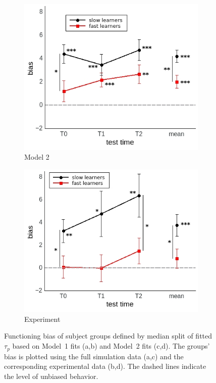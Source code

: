 \documentclass[a4paper]{scrreprt}
\begin{document}
\begin{figure}
\begin{subfigure}[b]{0.49\textwidth}
        \includegraphics[width=\textwidth]{figs/sec3/pred/pred_mod2mod2.jpeg}
        \caption{Model 2}
    \end{subfigure}
    \begin{subfigure}[b]{0.49\textwidth}
        \includegraphics[width=\textwidth]{figs/sec3/pred/pred_mod2dat.jpeg}
        \caption{Experiment}
    \end{subfigure}
\caption{Functioning bias of subject groups defined by median split of fitted $\tau_p$ based on Model~1 fits (a,b) and Model~2 fits (c,d). The groups' bias is plotted using the full simulation data (a,c) and the corresponding experimental data (b,d). The dashed lines indicate the level of unbiased behavior.}
\label{fig:pred_split}
\end{figure}
\end{document}
